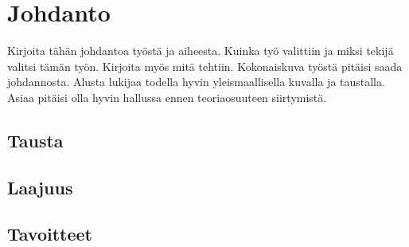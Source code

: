 \chapter{Johdanto}
\label{ch:johdanto}
\begin{it}
	Kirjoita tähän johdantoa työstä ja aiheesta. Kuinka työ valittiin ja miksi tekijä valitsi tämän työn. Kirjoita myös mitä tehtiin. Kokonaiskuva työstä pitäisi saada johdannosta. Alusta lukijaa todella hyvin yleismaallisella kuvalla ja taustalla. Asiaa pitäisi olla hyvin hallussa ennen teoriaosuuteen siirtymistä.
\end{it}

\section{Tausta}

\section{Laajuus}

\section{Tavoitteet}